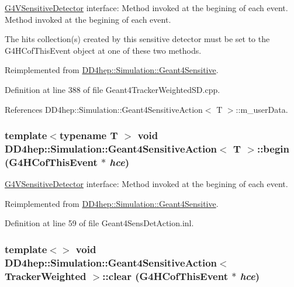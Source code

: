 \hyperlink{class_g4_v_sensitive_detector}{G4VSensitiveDetector} interface: Method invoked at the begining of each event. Method invoked at the begining of each event.

The hits collection(s) created by this sensitive detector must be set to the G4HCofThisEvent object at one of these two methods. 

Reimplemented from \hyperlink{class_d_d4hep_1_1_simulation_1_1_geant4_sensitive_a2967b095e6c32ae82f68a8b25a086c86}{DD4hep::Simulation::Geant4Sensitive}.

Definition at line 388 of file Geant4TrackerWeightedSD.cpp.

References DD4hep::Simulation::Geant4SensitiveAction$<$ T $>$::m\_\-userData.\hypertarget{class_d_d4hep_1_1_simulation_1_1_geant4_sensitive_action_a2e9739b3741bb245e3cc7edb41e7374d}{
\subsubsection[{begin}]{\setlength{\rightskip}{0pt plus 5cm}template$<$typename T $>$ void {\bf DD4hep::Simulation::Geant4SensitiveAction}$<$ T $>$::begin (G4HCofThisEvent $\ast$ {\em hce})}}
\label{class_d_d4hep_1_1_simulation_1_1_geant4_sensitive_action_a2e9739b3741bb245e3cc7edb41e7374d}


\hyperlink{class_g4_v_sensitive_detector}{G4VSensitiveDetector} interface: Method invoked at the begining of each event. 

Reimplemented from \hyperlink{class_d_d4hep_1_1_simulation_1_1_geant4_sensitive_a2967b095e6c32ae82f68a8b25a086c86}{DD4hep::Simulation::Geant4Sensitive}.

Definition at line 59 of file Geant4SensDetAction.inl.\hypertarget{class_d_d4hep_1_1_simulation_1_1_geant4_sensitive_action_a686893fef6dd49fb66408e09f1f6de18}{
\subsubsection[{clear}]{\setlength{\rightskip}{0pt plus 5cm}template$<$$>$ void {\bf DD4hep::Simulation::Geant4SensitiveAction}$<$ {\bf TrackerWeighted} $>$::clear (G4HCofThisEvent $\ast$ {\em hce})}}
\label{class_d_d4hep_1_1_simulation_1_1_geant4_sensitive_action_a686893fef6dd49fb66408e09f1f6de18}


